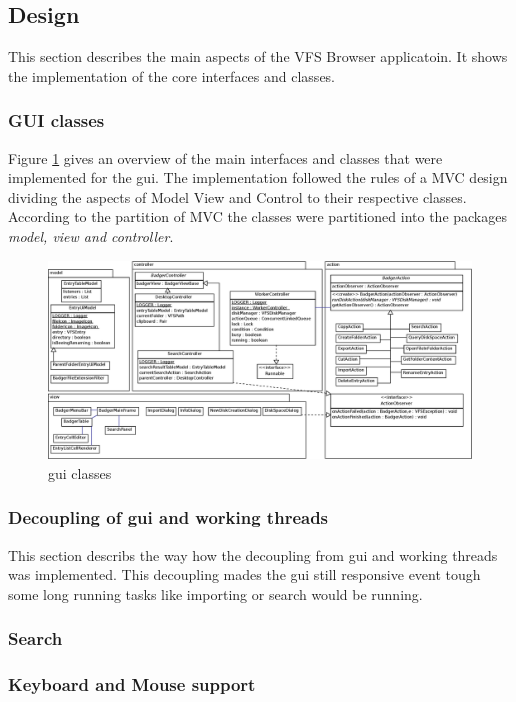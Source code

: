 \subsection{Design}
This section describes the main aspects of the VFS Browser applicatoin. It shows
the implementation of the core interfaces and classes.

\subsubsection{GUI classes}\label{sec:guiClasses}
Figure \ref{fig:gui_classes} gives an overview of the main interfaces and
classes that were implemented for the gui. The implementation followed the rules
of a MVC design dividing the aspects of Model View and Control to their
respective classes. According to the partition of MVC the classes were
partitioned into the packages \textit{model, view and controller}.

\begin{figure}[h!]
\centering
\includegraphics[width=1\textwidth]{figures/gui_classes.eps}
\caption{gui classes}
\label{fig:gui_classes}
\end{figure}


\subsubsection{Decoupling of gui and working threads}
This section describs the way how the decoupling from gui and working threads
was implemented. This decoupling mades the gui still responsive event tough some
long running tasks like importing or search would be running.


\subsubsection{Search}


\subsubsection{Keyboard and Mouse support}